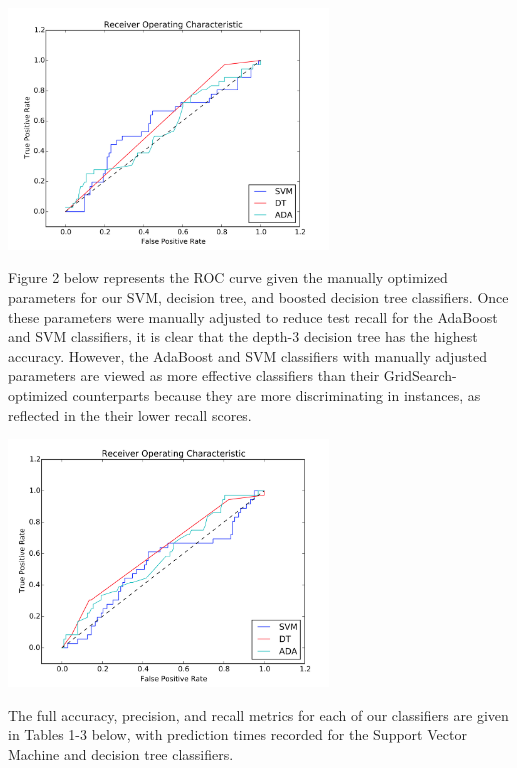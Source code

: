 \documentclass{article}
\begin{document}
\includegraphics[width=8.5cm]{ROC}

Figure 2 below represents the ROC curve given the manually optimized parameters for our SVM, decision tree, and boosted decision tree classifiers. Once these parameters were manually adjusted to reduce test recall for the AdaBoost and SVM classifiers, it is clear that the depth-3 decision tree has the highest accuracy. However, the AdaBoost and SVM classifiers with manually adjusted parameters are viewed as more effective classifiers than their GridSearch-optimized counterparts because they are more discriminating in instances, as reflected in the their lower recall scores.

\includegraphics[width=8.5cm]{ROC2}

The full accuracy, precision, and recall metrics for each of our classifiers are given in Tables 1-3 below, with prediction times recorded for the Support Vector Machine and decision tree classifiers.
\end{document}
